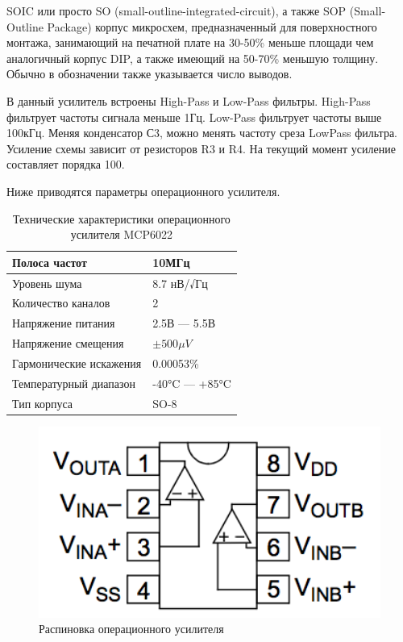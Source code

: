 SOIC или просто SO (small-outline-integrated-circuit), а также SOP (Small-Outline Package) корпус микросхем, предназначенный для поверхностного монтажа, занимающий на печатной плате на 30-50\% меньше площади чем аналогичный корпус DIP, а также имеющий на 50-70\% меньшую толщину. Обычно в обозначении также указывается число выводов.

В данный усилитель встроены High-Pass и Low-Pass фильтры. High-Pass фильтрует частоты сигнала меньше 1Гц. Low-Pass фильтрует частоты выше 100кГц. Меняя конденсатор С3, можно менять частоту среза LowPass фильтра. Усиление схемы зависит от резисторов R3 и R4. На текущий момент усиление составляет порядка 100.

Ниже приводятся параметры операционного усилителя.

\begin{table}[h]
\centering
\label{my-label}
\begin{tabular}{|l|l|}
\hline
Полоса частот                  & 10МГц                      \\ \hline
Уровень шума                   & 8.7 нВ/√Гц                 \\ \hline
Количество каналов             & 2                          \\ \hline
Напряжение питания             & 2.5В --- 5.5В              \\ \hline
Напряжение смещения            & $\pm500\mu V $             \\ \hline
Гармонические искажения        & 0.00053\%                  \\ \hline
Температурный диапазон         & -40°C --- +85°C            \\ \hline
Тип корпуса                    & SO-8                       \\ \hline
\end{tabular}
\caption{Технические характеристики операционного усилителя MCP6022}
\end{table}

\begin{figure}[H]
\centering
\includegraphics[width=12cm]{op-amp.png}
\caption{Распиновка операционного усилителя}
\end{figure}

